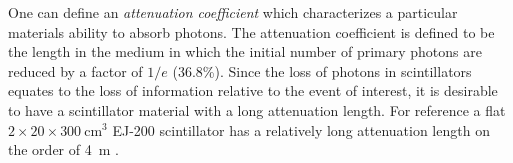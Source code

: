 
One can define an \textit{attenuation coefficient} which characterizes a particular materials ability to absorb photons. The attenuation coefficient is defined to be the length in the medium in which the initial number of primary photons are reduced by a factor of $1/e$ (36.8\%).  Since the loss of photons in scintillators equates to the loss of information relative to the event of interest, it is desirable to have a scintillator material with a long attenuation length.  For reference a flat $2 \times 20 \times 300\ \mathrm{cm^{3}}$ EJ-200 scintillator has a relatively long attenuation length on the order of 4~m \cite{ej200_specs}.

